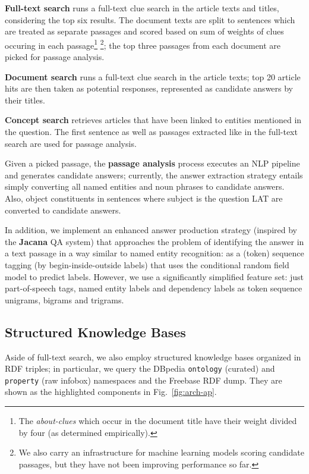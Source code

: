 \textbf{Full-text search} \citep{WatsonIR} runs a full-text clue search in the article texts and titles,
considering the top six results.
The document texts are split to sentences which are treated as separate passages
and scored based on sum of weights of clues occuring in each passage\footnote{%
The \textit{about-clues} which occur in the document title have their weight divided by four (as determined empirically).}%
\footnote{We also carry an infrastructure for machine learning models scoring candidate passages,
		but they have not been improving performance so far.};
the top three passages from each document are picked for passage analysis.

\textbf{Document search} \citep{WatsonIR} runs a full-text clue search in the article texts;
top 20 article hits are then taken as potential responses,
represented as candidate answers by their titles.

\textbf{Concept search} retrieves articles that have been linked to entities mentioned in the question.
The first sentence as well as passages extracted like in the full-text search are used for passage analysis.

Given a picked passage, the \textbf{passage analysis} process executes an NLP pipeline and generates candidate answers;
currently, the answer extraction strategy entails simply converting all named entities and noun phrases to candidate answers.
Also, object constituents in sentences where subject is the question LAT are converted to candidate answers.

In addition, we implement
an enhanced answer production strategy (inspired by the \textbf{Jacana} QA system)
that approaches the problem of identifying
the answer in a text passage in a way similar to named entity recognition: as
a (token) sequence tagging (by begin-inside-outside labels) that uses the conditional
random field model to predict labels.  \cite{TreeEdit2013Yao}
However, we use a significantly simplified feature set: just part-of-speech tags,
named entity labels and dependency labels as token sequence unigrams, bigrams and trigrams.

\subsection{Structured Knowledge Bases}

Aside of full-text search, we also employ structured knowledge bases organized in RDF triples;
in particular, we query the DBpedia \texttt{ontology} (curated) and \texttt{property} (raw infobox)
namespaces and the Freebase RDF dump.
They are shown as the highlighted components in Fig.~\ref{fig:arch-ap}.


